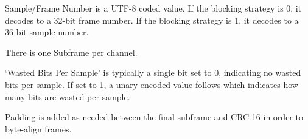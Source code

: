 \noindent
Sample/Frame Number is a UTF-8 coded value.
If the blocking strategy is 0, it decodes to a 32-bit frame number.
If the blocking strategy is 1, it decodes to a 36-bit sample number.

There is one Subframe per channel.

`Wasted Bits Per Sample' is typically a single bit set to 0, indicating
no wasted bits per sample.  If set to 1, a unary-encoded value
follows which indicates how many bits are wasted per sample.

Padding is added as needed between the final subframe and CRC-16
in order to byte-align frames.
